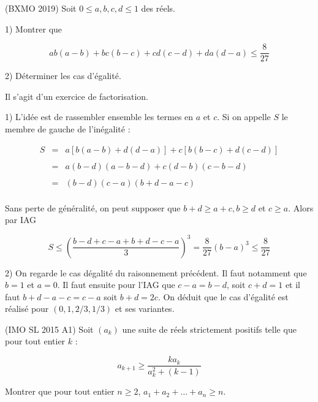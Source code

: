 \begin{exo}
(BXMO 2019) Soit $0\leqslant a,b,c,d\leqslant 1$ des réels. 

1) Montrer que 

\[ab(a-b)+bc(b-c)+cd(c-d)+da(d-a) \leqslant \frac{8}{27}\]

2) Déterminer les cas d'égalité. 
\end{exo}

\begin{sol}
Il s'agit d'un exercice de factorisation. 

1) L'idée est de rassembler ensemble les termes en $a$ et $c$. Si on appelle $S$ le membre de gauche de l'inégalité : 

\[\begin{array}{lll}
S &=& a[b(a-b)+d(d-a)] + c[b(b-c)+d(c-d)]\\
&&\\
&=& a(b-d)(a-b-d) + c(d-b)(c-b-d)\\
&&\\
&=& (b-d)(c-a)(b+d-a-c)\\ 
\end{array}\]

Sans perte de généralité, on peut supposer que $b+d\geqslant a+c, b\geqslant d$ et $c\geqslant a$. Alors par IAG 

\[S\leqslant \left(\frac{b-d+c-a+b+d-c-a}{3}\right)^3 = \frac{8}{27}(b-a)^3\leqslant \frac{8}{27}\]

2) On regarde le cas dégalité du raisonnement précédent. Il faut notamment que $b=1$ et $a=0$. Il faut ensuite pour l'IAG que $c-a=b-d$, soit $c+d=1$ et il faut $b+d-a-c= c-a$ soit $b+d=2c$. On déduit que le cas d'égalité est réalisé pour $(0,1,2/3,1/3)$ et ses variantes. 
\end{sol}





\begin{exo}
(IMO SL 2015 A1)
Soit $(a_k)$ une suite de réels strictement positifs telle que pour tout entier $k$ : 

\[a_{k+1} \geqslant \frac{ka_k}{a_k^2 +(k-1)}\]

Montrer que pour tout entier $n\geqslant 2$, $a_1+a_2+\ldots +a_n \geqslant n$. 
\end{exo}

